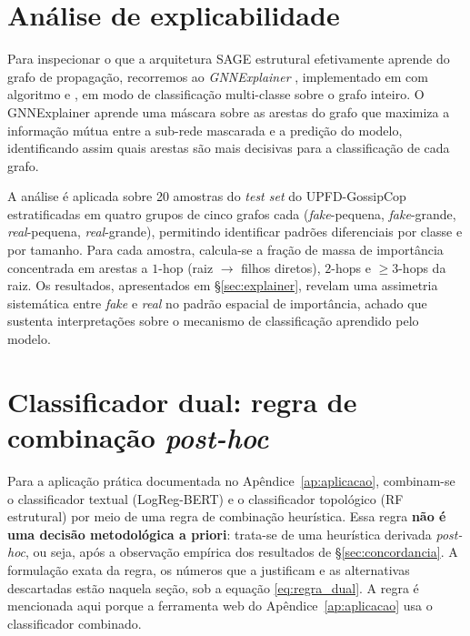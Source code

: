 \section{An\'alise de explicabilidade}
\label{sec:analise_explicabilidade}

Para inspecionar o que a arquitetura SAGE estrutural efetivamente aprende
do grafo de propaga\c{c}\~ao, recorremos ao \emph{GNNExplainer}
\cite{ying2019gnnexplainer}, implementado em
 com algoritmo
 e , em
modo de classifica\c{c}\~ao multi-classe sobre o grafo inteiro. O
GNNExplainer aprende uma m\'ascara sobre as arestas do grafo que maximiza
a informa\c{c}\~ao m\'utua entre a sub-rede mascarada e a predi\c{c}\~ao do
modelo, identificando assim quais arestas s\~ao mais decisivas para a
classifica\c{c}\~ao de cada grafo.

A an\'alise \'e aplicada sobre 20 amostras do \emph{test set} do
UPFD-GossipCop estratificadas em quatro grupos de cinco grafos cada
(\emph{fake}-pequena, \emph{fake}-grande, \emph{real}-pequena,
\emph{real}-grande), permitindo identificar padr\~oes diferenciais por
classe e por tamanho. Para cada amostra, calcula-se a fra\c{c}\~ao de
massa de import\^ancia concentrada em arestas a $1$-hop (raiz $\to$ filhos
diretos), $2$-hops e $\geq 3$-hops da raiz. Os resultados, apresentados
em \S\ref{sec:explainer}, revelam uma assimetria sistem\'atica entre
\emph{fake} e \emph{real} no padr\~ao espacial de import\^ancia,
achado que sustenta interpreta\c{c}\~oes sobre o mecanismo de
classifica\c{c}\~ao aprendido pelo modelo.

\section{Classificador dual: regra de combina\c{c}\~ao \emph{post-hoc}}
\label{sec:dual}

Para a aplica\c{c}\~ao pr\'atica documentada no
Ap\^endice~\ref{ap:aplicacao}, combinam-se o classificador textual
(LogReg-BERT) e o classificador topol\'ogico (RF estrutural) por meio de
uma regra de combina\c{c}\~ao heur\'istica. Essa regra \textbf{n\~ao \'e uma decis\~ao metodol\'ogica a
priori}: trata-se de uma heur\'istica derivada \emph{post-hoc}, ou seja,
ap\'os a observa\c{c}\~ao emp\'irica dos resultados de
\S\ref{sec:concordancia}. A formula\c{c}\~ao exata da regra, os n\'umeros
que a justificam e as alternativas descartadas est\~ao naquela se\c{c}\~ao,
sob a equa\c{c}\~ao \eqref{eq:regra_dual}. A regra \'e mencionada aqui
porque a ferramenta web do Ap\^endice~\ref{ap:aplicacao} usa o
classificador combinado.

